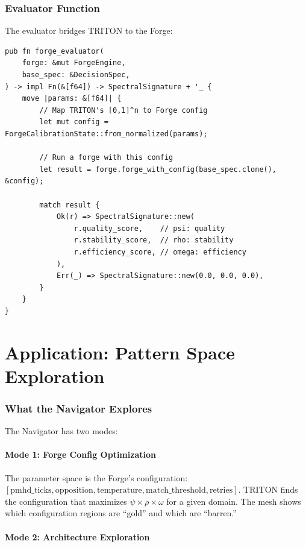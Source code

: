 \documentclass[11pt,a4paper,twoside]{article}
\theoremstyle{definition}
\theoremstyle{plain}
\theoremstyle{remark}
\begin{document}
\section{Evaluator Function}\label{sec:evaluator}

The evaluator bridges TRITON to the Forge:
\begin{lstlisting}
pub fn forge_evaluator(
    forge: &mut ForgeEngine,
    base_spec: &DecisionSpec,
) -> impl Fn(&[f64]) -> SpectralSignature + '_ {
    move |params: &[f64]| {
        // Map TRITON's [0,1]^n to Forge config
        let mut config = ForgeCalibrationState::from_normalized(params);

        // Run a forge with this config
        let result = forge.forge_with_config(base_spec.clone(), &config);

        match result {
            Ok(r) => SpectralSignature::new(
                r.quality_score,    // psi: quality
                r.stability_score,  // rho: stability
                r.efficiency_score, // omega: efficiency
            ),
            Err(_) => SpectralSignature::new(0.0, 0.0, 0.0),
        }
    }
}
\end{lstlisting}


\part{Application: Pattern Space Exploration}\label{part:patternspace}

\section{What the Navigator Explores}\label{sec:explores}

The Navigator has two modes:

\subsection{Mode 1: Forge Config Optimization}

The parameter space is the Forge's configuration:
$[\text{pmhd\_ticks}, \text{opposition}, \text{temperature},
\text{match\_threshold}, \text{retries}]$. TRITON finds the
configuration that maximizes $\psi \times \rho \times \omega$ for
a given domain. The mesh shows which configuration regions are
``gold'' and which are ``barren.''

\subsection{Mode 2: Architecture Exploration}
\end{document}
